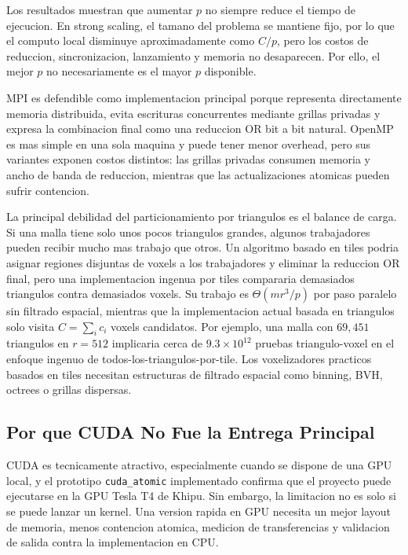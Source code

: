 \documentclass[conference]{IEEEtran}
\begin{document}
Los resultados muestran que aumentar $p$ no siempre reduce el tiempo de
ejecucion. En strong scaling, el tamano del problema se mantiene fijo, por lo
que el computo local disminuye aproximadamente como $C/p$, pero los costos de
reduccion, sincronizacion, lanzamiento y memoria no desaparecen. Por ello, el
mejor $p$ no necesariamente es el mayor $p$ disponible.

MPI es defendible como implementacion principal porque representa directamente
memoria distribuida, evita escrituras concurrentes mediante grillas privadas y
expresa la combinacion final como una reduccion OR bit a bit natural. OpenMP es
mas simple en una sola maquina y puede tener menor overhead, pero sus variantes
exponen costos distintos: las grillas privadas consumen memoria y ancho de banda
de reduccion, mientras que las actualizaciones atomicas pueden sufrir contencion.

La principal debilidad del particionamiento por triangulos es el balance de
carga. Si una malla tiene solo unos pocos triangulos grandes, algunos
trabajadores pueden recibir mucho mas trabajo que otros. Un algoritmo basado en
tiles podria asignar regiones disjuntas de voxels a los trabajadores y eliminar
la reduccion OR final, pero una implementacion ingenua por tiles compararia
demasiados triangulos contra demasiados voxels. Su trabajo es
$\Theta(mr^3/p)$ por paso paralelo sin filtrado espacial, mientras que la
implementacion actual basada en triangulos solo visita
$C=\sum_i c_i$ voxels candidatos. Por ejemplo, una malla con $69{,}451$
triangulos en $r=512$ implicaria cerca de $9.3\times10^{12}$ pruebas
triangulo-voxel en el enfoque ingenuo de todos-los-triangulos-por-tile. Los
voxelizadores practicos basados en tiles necesitan estructuras de filtrado
espacial como binning, BVH, octrees o grillas dispersas.

\subsection{Por que CUDA No Fue la Entrega Principal}

CUDA es tecnicamente atractivo, especialmente cuando se dispone de una GPU local,
y el prototipo \texttt{cuda\_atomic} implementado confirma que el proyecto puede
ejecutarse en la GPU Tesla T4 de Khipu. Sin embargo, la limitacion no es solo si
se puede lanzar un kernel. Una version rapida en GPU necesita un mejor layout de
memoria, menos contencion atomica, medicion de transferencias y validacion de
salida contra la implementacion en CPU.
\end{document}
